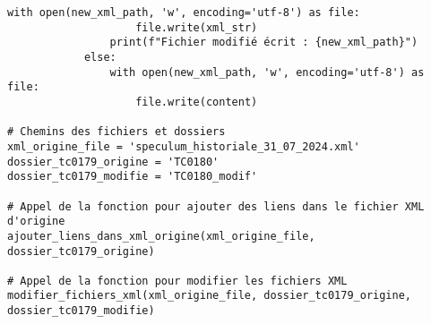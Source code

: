 \begin{lstlisting}[breaklines=true]
				with open(new_xml_path, 'w', encoding='utf-8') as file:
					file.write(xml_str)
				print(f"Fichier modifié écrit : {new_xml_path}")
			else:
				with open(new_xml_path, 'w', encoding='utf-8') as file:
					file.write(content)
	
# Chemins des fichiers et dossiers
xml_origine_file = 'speculum_historiale_31_07_2024.xml'
dossier_tc0179_origine = 'TC0180'
dossier_tc0179_modifie = 'TC0180_modif'
	
# Appel de la fonction pour ajouter des liens dans le fichier XML d'origine
ajouter_liens_dans_xml_origine(xml_origine_file, dossier_tc0179_origine)
	
# Appel de la fonction pour modifier les fichiers XML
modifier_fichiers_xml(xml_origine_file, dossier_tc0179_origine, dossier_tc0179_modifie)
	
\end{lstlisting}

